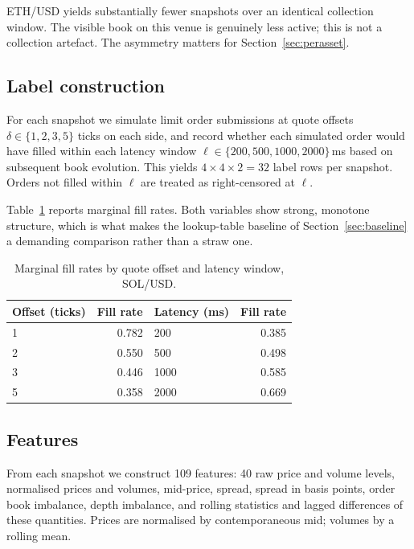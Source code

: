 \documentclass[11pt]{article}
\begin{document}
\noindent
ETH/USD yields substantially fewer snapshots over an identical collection
window. The visible book on this venue is genuinely less active; this is not a
collection artefact. The asymmetry matters for Section~\ref{sec:perasset}.

\subsection{Label construction}

For each snapshot we simulate limit order submissions at quote offsets
$\delta \in \{1,2,3,5\}$ ticks on each side, and record whether each simulated
order would have filled within each latency window
$\ell \in \{200, 500, 1000, 2000\}$\,ms based on subsequent book evolution. This
yields $4 \times 4 \times 2 = 32$ label rows per snapshot. Orders not filled
within $\ell$ are treated as right-censored at $\ell$.

Table~\ref{tab:marginals} reports marginal fill rates. Both variables show strong, monotone structure, which is what makes the
lookup-table baseline of Section~\ref{sec:baseline} a demanding comparison
rather than a straw one.

\begin{table}[h]
\centering
\caption{Marginal fill rates by quote offset and latency window, SOL/USD.}
\label{tab:marginals}
\begin{tabular}{lr@{\hskip 2.5em}lr}
\toprule
Offset (ticks) & Fill rate & Latency (ms) & Fill rate \\
\midrule
1 & 0.782 & 200  & 0.385 \\
2 & 0.550 & 500  & 0.498 \\
3 & 0.446 & 1000 & 0.585 \\
5 & 0.358 & 2000 & 0.669 \\
\bottomrule
\end{tabular}
\end{table}

\subsection{Features}

From each snapshot we construct 109 features: 40 raw price and volume levels,
normalised prices and volumes, mid-price, spread, spread in basis points, order
book imbalance, depth imbalance, and rolling statistics and lagged differences of
these quantities. Prices are normalised by contemporaneous mid; volumes by a
rolling mean.
\end{document}
